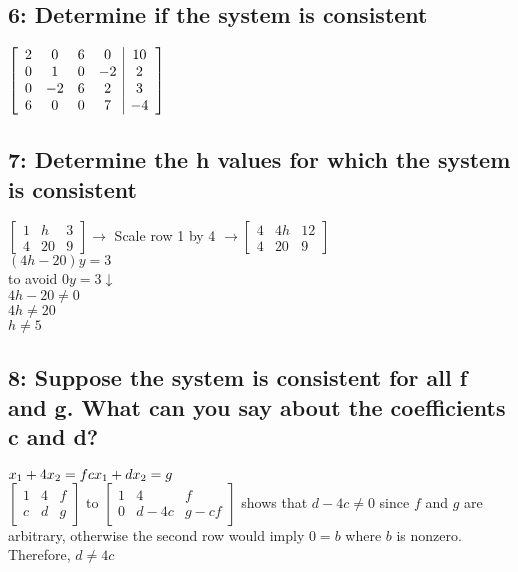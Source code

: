 \documentclass{article}
\begin{document}
\subsection*{6: Determine if the system is consistent}
$\left[\begin{array}{cccc|c}
2 & 0 & 6 & 0 & 10 \\
0 & 1 & 0 & -2 & 2 \\
0 & -2 & 6 & 2 & 3 \\
6 & 0 & 0 & 7 & -4 \\
\end{array}\right] \\[0.05in]
$ 
\pagebreak 
\subsection*{7: Determine the h values for which the system is consistent}
$\left[\begin{array}{cc|c} 1 & h & 3 \\4 & 20 & 9 \end{array}\right] \rightarrow 
$ Scale row 1 by 4 $\rightarrow \left[\begin{array}{cc|c} 4 & 4h & 12 \\4 & 20 & 9 \end{array}\right] $
\\$(4h-20)y=3$ \\ to avoid $0y=3 \downarrow$ \\ $4h-20\neq 0$\\$4h\neq 20$ \\ $h \neq 5$

\subsection*{8: Suppose the system is consistent for all f and g. What can you say about the coefficients c and d?}
$x_1+ 4x_2=f\\cx_1+dx_2=g$\\[0.05in]
$\left[\begin{array}{cc|c}
    1 & 4 & f \\
    c & d & g
    \end{array}\right]
$ to 
$\left[\begin{array}{cc|c}
    1 & 4 & f \\
    0 & d-4c & g-cf
    \end{array}\right]
$ shows that $d-4c \neq 0$ since $f$ and $g$ are arbitrary, otherwise the second row would imply $0=b$ where $b$ is nonzero. Therefore, $d \neq 4c$
\end{document}
